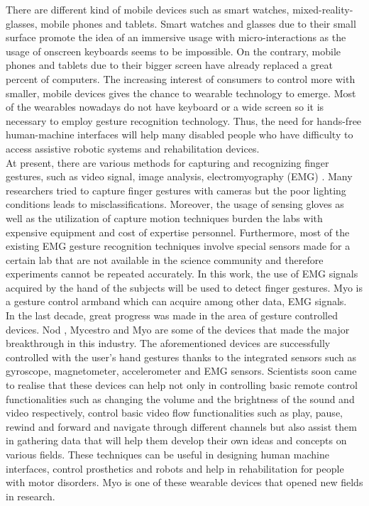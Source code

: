 There are different kind of mobile devices such as smart watches, mixed-reality-glasses, mobile phones and tablets. Smart watches and glasses due to their small surface promote the idea of an immersive usage with micro-interactions as the usage of onscreen keyboards seems to be impossible. On the contrary, mobile phones and tablets due to their bigger screen have already replaced a great percent of computers. The increasing interest of consumers to control more with smaller, mobile devices gives the chance to wearable technology to emerge. Most of the wearables nowadays do not have keyboard or a wide screen so it is necessary to employ gesture recognition technology. Thus, the need for hands-free human-machine interfaces will help many disabled people who have difficulty to access assistive robotic systems and rehabilitation devices.\\
At present, there are various methods for capturing and recognizing finger gestures, such as video signal, image analysis, electromyography (EMG) \cite{zhang_tomo:_2015,shin_dynamic_2016,kakoty_exploring_2015,zhao_study_2007}. Many researchers tried to capture finger gestures with cameras but the poor lighting conditions leads to misclassifications. Moreover, the usage of sensing gloves as well as the utilization of capture motion techniques burden the labs with expensive equipment and cost of expertise personnel. Furthermore, most of the existing EMG gesture recognition techniques involve special sensors made for a certain lab that are not available in the science community and therefore experiments cannot be repeated accurately. In this work, the use of EMG signals acquired by the hand of the subjects will be used to detect finger gestures. Myo is a gesture control armband which can acquire among other data, EMG signals.\\
In the last decade, great progress was made in the area of gesture controlled devices. Nod \cite{nod}, Mycestro \cite{mycestro} and Myo \cite{myo} are some of the devices that made the major breakthrough in this industry. The aforementioned devices are successfully controlled with the user’s hand gestures thanks to the integrated sensors such as gyroscope, magnetometer, accelerometer and EMG sensors. Scientists soon came to realise that these devices can help not only in controlling basic remote control functionalities such as changing the volume and the brightness of the sound and video respectively, control basic video flow functionalities such as play, pause, rewind and forward and  navigate through different channels but also assist them in gathering data that will help them develop their own ideas and concepts on various fields. These techniques can be useful in designing human machine interfaces, control prosthetics and robots and help in rehabilitation for people with motor disorders. Myo is one of these wearable devices that opened new fields in research.\\
